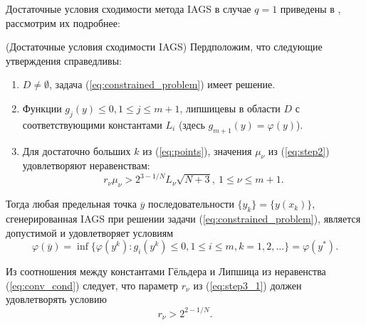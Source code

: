 Достаточные условия сходимости метода IAGS в случае \(q=1\) приведены в \cite{Strongin2000}, рассмотрим их подробнее:
\begin{theorem} (Достаточные условия сходимости IAGS)
  \label{th:single_conv}
  Пердположим, что следующие утверждения справедливы:
  \begin{enumerate}
    \item \(D\ne\emptyset\), задача (\ref{eq:constrained_problem}) имеет решение.
    \item Функции \(g_j(y)\leqslant 0, 1\leqslant j\leqslant m + 1\), липшицевы в области \(D\) с соответствующими константами \(L_i\)
     (здесь \(g_{m+1}(y)=\varphi(y)\)).
    \item Для достаточно больших \(k\) из (\ref{eq:points}),
    значения \(\mu_\nu\) из (\ref{eq:step2}) удовлетворяют неравенствам:
    \begin{equation}
      r_\nu\mu_\nu > 2^{3-1/N}L_\nu \sqrt{N+3},\: 1\leqslant \nu \leqslant m + 1.
    \end{equation}
  \end{enumerate}
  Тогда любая предельная точка \(\overline{y}\) последовательности \(\{y_k\} = \{y(x_k)\}\), сгенерированная
  IAGS при решении задачи (\ref{eq:constrained_problem}), является допустимой и удовлетворяет условиям
\begin{equation}
  \label{eq:conv_cond}
  \varphi(\overline{y})=\inf\{ \varphi(y^k): g_i(y^k)\leqslant 0,1\leqslant i\leqslant m, k=1,2,\dots\}=\varphi(y^*).
\end{equation}
\end{theorem}

\begin{remark}
  \label{rem:r1}
  Из соотношения между константами Гёльдера и Липшица из неравенства (\ref{eq:conv_cond}) следует, что
  параметр \(r_\nu\) из (\ref{eq:step3_1}) должен удовлетворять условию
  \begin{equation}
    r_\nu > 2^{2 - 1/N}.
  \end{equation}
\end{remark}

